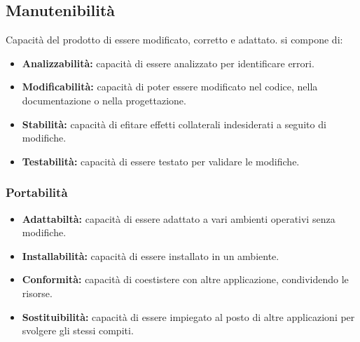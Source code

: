 \subsection{Manutenibilit\`a}
Capacit\`a del prodotto di essere modificato, corretto e adattato. si compone di:
\begin{itemize}
    \item \textbf{Analizzabilit\`a: }capacit\`a di essere analizzato per identificare errori.
    \item \textbf{Modificabilit\`a: }capacit\`a di poter essere modificato nel codice, nella documentazione o nella progettazione.
    \item \textbf{Stabilit\`a: }capacit\`a di efitare effetti collaterali indesiderati a seguito di modifiche.
    \item \textbf{Testabilit\`a: }capacit\`a di essere testato per validare le modifiche.
\end{itemize}
\subsubsection{Portabilit\`a}
\begin{itemize}
    \item \textbf{Adattabilt\`a: }capacit\`a di essere adattato a vari ambienti operativi senza modifiche.
    \item \textbf{Installabilit\`a: }capacit\`a di essere installato in un ambiente.
    \item \textbf{Conformit\`a: }capacit\`a di coestistere con altre applicazione, condividendo le risorse.
    \item \textbf{Sostituibilit\`a: }capacit\`a di essere impiegato al posto di altre applicazioni per svolgere gli stessi compiti.
\end{itemize}